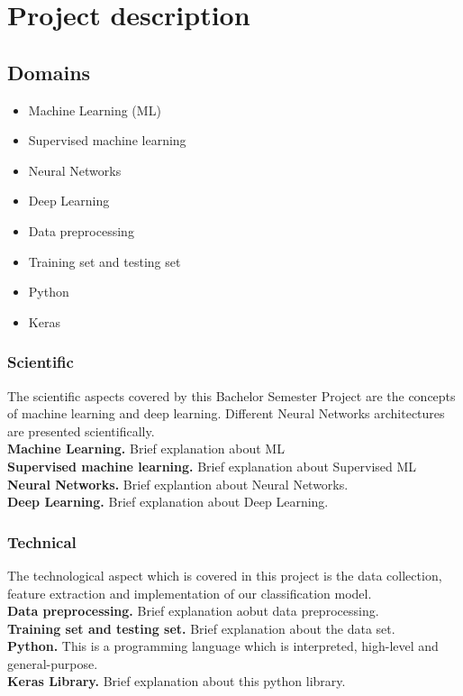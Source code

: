 \section{Project description}
\subsection{Domains}

\begin{itemize}
        \item Machine Learning (ML)
        \item Supervised machine learning
        \item Neural Networks
        \item Deep Learning 
        \item Data preprocessing
        \item Training set and testing set
        \item Python
        \item Keras
\end{itemize}

\subsubsection{Scientific}

The scientific aspects covered by this Bachelor Semester Project are the
concepts of machine learning and deep learning. Different Neural Networks
architectures are presented scientifically. \\

\textbf{Machine Learning.} Brief explanation about ML\\

\textbf{Supervised machine learning.} Brief explanation about Supervised ML\\

\textbf{Neural Networks.} Brief explantion about Neural Networks.\\

\textbf{Deep Learning.} Brief explanation about Deep Learning.\\

\subsubsection{Technical} The technological aspect which is covered in this
project is the data collection, feature extraction and implementation of our
classification model. \\

\textbf{Data preprocessing.} Brief explanation aobut data preprocessing.\\

\textbf{Training set and testing set.} Brief explanation about the data set.\\

\textbf{Python.} This is a programming language which is interpreted, high-level
and general-purpose. \cite{Python}\\

\textbf{Keras Library.} Brief explanation about this python library.\\
